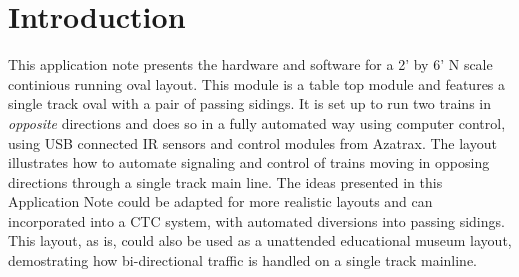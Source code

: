 
\chapter{Introduction}
\label{chapt:Introduction}

This application note presents the hardware and software for a 2' by 6'
N scale continious running oval layout.  This module is a table top
module and features a single track oval with a pair of passing sidings.
 It is set up to run two trains in \textit{opposite} directions and
does so in a fully automated way using computer control, using USB
connected IR sensors and control modules from Azatrax.  The layout
illustrates how to automate signaling and control of trains moving in
opposing directions through a single track main line.  The ideas
presented in this Application Note could be adapted for more realistic
layouts and can incorporated into a CTC system, with automated
diversions into passing sidings.  This layout, as is, could also be
used as a unattended educational museum layout, demostrating how
bi-directional traffic is handled on a single track mainline.

